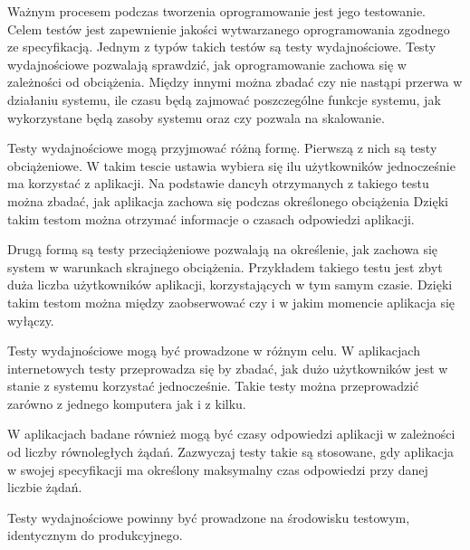 Ważnym procesem podczas tworzenia oprogramowanie jest jego testowanie. Celem testów jest zapewnienie jakości wytwarzanego oprogramowania zgodnego ze specyfikacją. Jednym z typów takich testów są testy wydajnościowe. Testy wydajnościowe pozwalają sprawdzić, jak oprogramowanie zachowa się w zależności od obciążenia. Między innymi można zbadać czy nie nastąpi przerwa w działaniu systemu, ile czasu będą zajmować poszczególne funkcje systemu, jak wykorzystane będą zasoby systemu oraz czy pozwala na skalowanie. 

Testy wydajnościowe mogą przyjmować różną formę. Pierwszą z nich są testy obciążeniowe. W takim tescie ustawia wybiera się ilu użytkowników jednocześnie ma korzystać z aplikacji. Na podstawie dancyh otrzymanych z takiego testu można zbadać, jak aplikacja zachowa się podczas określonego obciążenia Dzięki takim testom można otrzymać informacje o czasach odpowiedzi aplikacji.

Drugą formą są testy przeciążeniowe pozwalają na określenie, jak zachowa się system w warunkach skrajnego obciążenia. Przykładem takiego testu jest zbyt duża liczba użytkowników aplikacji, korzystających w tym samym czasie. Dzięki takim testom można między zaobserwować czy i w jakim momencie aplikacja się wyłączy.

Testy wydajnościowe mogą być prowadzone w różnym celu. W aplikacjach internetowych testy przeprowadza się by zbadać, jak dużo użytkowników jest w stanie z systemu korzystać jednocześnie. Takie testy można przeprowadzić zarówno z jednego komputera jak i z kilku. 

W aplikacjach badane również mogą być czasy odpowiedzi aplikacji w zależności od liczby równoległych żądań. Zazwyczaj testy takie są stosowane, gdy aplikacja w swojej specyfikacji ma określony maksymalny czas odpowiedzi przy danej liczbie żądań.

Testy wydajnościowe powinny być prowadzone na środowisku testowym, identycznym do produkcyjnego.